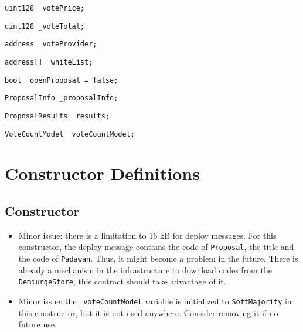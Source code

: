 \begin{lstlisting}[firstnumber=20]
    uint128 _votePrice;
\end{lstlisting}

\begin{lstlisting}[firstnumber=21]
    uint128 _voteTotal;
\end{lstlisting}

\begin{lstlisting}[firstnumber=22]
    address _voteProvider;
\end{lstlisting}

\begin{lstlisting}[firstnumber=24]
    address[] _whiteList;
\end{lstlisting}

\begin{lstlisting}[firstnumber=25]
    bool _openProposal = false;
\end{lstlisting}

\begin{lstlisting}[firstnumber=27]
    ProposalInfo _proposalInfo;
\end{lstlisting}

\begin{lstlisting}[firstnumber=29]
    ProposalResults _results;
\end{lstlisting}

\begin{lstlisting}[firstnumber=30]
    VoteCountModel _voteCountModel;
\end{lstlisting}

\section{Constructor Definitions}


\subsection{Constructor}

\begin{itemize}
\item Minor issue: there is a limitation to 16 kB for deploy
  messages. For this constructor, the deploy message contains the code
  of {\tt Proposal}, the title and the code of {\tt Padawan}. Thus, it
  might become a problem in the future. There is already a mechanism
  in the infrastructure to download codes from the {\tt
    DemiurgeStore}, this contract should take advantage of it.
\item Minor issue: the {\tt \_voteCountModel} variable is initialized
  to {\tt SoftMajority} in this constructor, but it is not used
  anywhere. Consider removing it if no future use.
\end{itemize}


